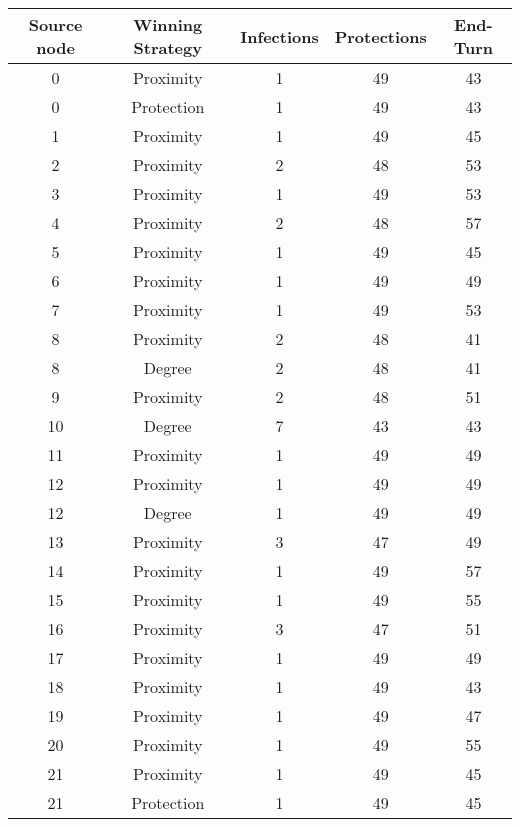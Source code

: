 \documentclass[results.tex]{subfiles}
\begin{document}
\begin{center}
  \begin{tabular}{| c || c | c | c | c |}
    \hline
    {\bfseries Source node} & {\bfseries Winning Strategy} & {\bfseries Infections} & {\bfseries Protections} & {\bfseries End-Turn} \\  %
    \hline\hline
    0 & Proximity & 1 & 49 & 43 \\ 
    \hline
    0 & Protection & 1 & 49 & 43 \\ 
    \hline
    1 & Proximity & 1 & 49 & 45 \\ 
    \hline
    2 & Proximity & 2 & 48 & 53 \\ 
    \hline
    3 & Proximity & 1 & 49 & 53 \\ 
    \hline
    4 & Proximity & 2 & 48 & 57 \\ 
    \hline
    5 & Proximity & 1 & 49 & 45 \\ 
    \hline
    6 & Proximity & 1 & 49 & 49 \\ 
    \hline
    7 & Proximity & 1 & 49 & 53 \\ 
    \hline
    8 & Proximity & 2 & 48 & 41 \\ 
    \hline
    8 & Degree & 2 & 48 & 41 \\ 
    \hline
    9 & Proximity & 2 & 48 & 51 \\ 
    \hline
    10 & Degree & 7 & 43 & 43 \\ 
    \hline
    11 & Proximity & 1 & 49 & 49 \\ 
    \hline
    12 & Proximity & 1 & 49 & 49 \\ 
    \hline
    12 & Degree & 1 & 49 & 49 \\ 
    \hline
    13 & Proximity & 3 & 47 & 49 \\ 
    \hline
    14 & Proximity & 1 & 49 & 57 \\ 
    \hline
    15 & Proximity & 1 & 49 & 55 \\ 
    \hline
    16 & Proximity & 3 & 47 & 51 \\ 
    \hline
    17 & Proximity & 1 & 49 & 49 \\ 
    \hline
    18 & Proximity & 1 & 49 & 43 \\ 
    \hline
    19 & Proximity & 1 & 49 & 47 \\ 
    \hline
    20 & Proximity & 1 & 49 & 55 \\ 
    \hline
    21 & Proximity & 1 & 49 & 45 \\ 
    \hline
    21 & Protection & 1 & 49 & 45 \\ 

\end{tabular}
\end{center}
\end{document}
